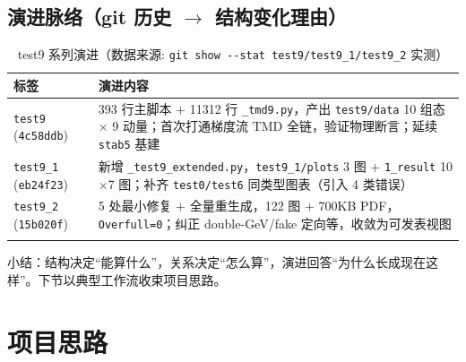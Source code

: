 \documentclass[UTF8]{ctexart}
\begin{document}
\subsection{演进脉络（git 历史 $\rightarrow$ 结构变化理由）}
\tiny
\begin{xltabular}{\textwidth}{lX}
\toprule
\textcolor{relation}{标签} & \textcolor{relation}{演进内容} \\
\midrule
\endhead
\texttt{\nolinkurl{test9}} (\texttt{\nolinkurl{4c58ddb}}) & 393 行主脚本 $+$ 11312 行 \texttt{\nolinkurl{\_tmd9.py}}，产出 \texttt{\nolinkurl{test9/data}} 10 组态 $\times$ 9 动量；首次打通梯度流 TMD 全链，验证物理断言；延续 \texttt{\nolinkurl{stab5}} 基建 \\
\texttt{\nolinkurl{test9\_1}} (\texttt{\nolinkurl{eb24f23}}) & 新增 \texttt{\nolinkurl{\_test9\_extended.py}}，\texttt{\nolinkurl{test9\_1/plots}} 3 图 $+$ \texttt{\nolinkurl{1\_result}} 10$\times$7 图；补齐 \texttt{\nolinkurl{test0/test6}} 同类型图表（引入 4 类错误） \\
\texttt{\nolinkurl{test9\_2}} (\texttt{\nolinkurl{15b020f}}) & 5 处最小修复 $+$ 全量重生成，122 图 $+$ 700KB PDF，\texttt{\nolinkurl{Overfull=0}}；纠正 double-GeV/fake 定向等，收敛为可发表视图 \\
\bottomrule
\caption{test9 系列演进（数据来源: \texttt{\nolinkurl{git show --stat test9/test9\_1/test9\_2}} 实测）}
\end{xltabular}

小结：结构决定“能算什么”，关系决定“怎么算”，演进回答“为什么长成现在这样”。下节以典型工作流收束项目思路。

\section{项目思路}
\label{sec:idea}
\end{document}
